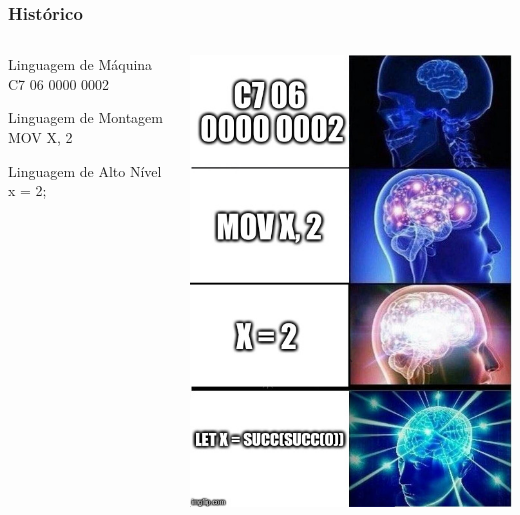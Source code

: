 \documentclass[table]{beamer}
\begin{document}
\begin{frame}
   \frametitle{Histórico}
   \begin{columns}
      \begin{column}{0.5\textwidth}
         \begin{block}{Linguagem de Máquina}
         C7 06 0000 0002
         \end{block}

         \begin{block}{Linguagem de Montagem}
         MOV X, 2
         \end{block}

         \begin{block}{Linguagem de Alto Nível}
         x = 2;
         \end{block}
      \end{column}
      \begin{column}{0.5\textwidth}
         \includegraphics[scale=0.3]{figuras/expandingbrain.jpg}
      \end{column}
   \end{columns}

\end{frame}
\end{document}
